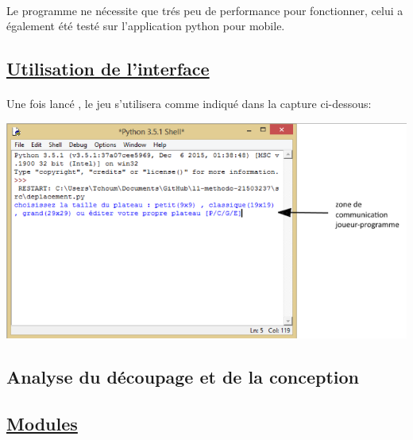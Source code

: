 \documentclass[a4paper,12pt]{article}
\begin{document}
\paragraph{}
Le programme ne nécessite que trés peu de performance pour fonctionner, celui a également été testé sur l'application python pour mobile.


\subsection{\underline{Utilisation de l'interface}}
\paragraph{}
Une fois lancé , le jeu s'utilisera comme indiqué dans la capture ci-dessous:
\begin{center}
\includegraphics[scale=0.5]{images/interface.png}
\end{center}



\newpage
\begin{center}
\section{Analyse du découpage et de la conception}
\vspace{1cm}
\end{center}
\subsection{\underline{Modules }}
\end{document}

